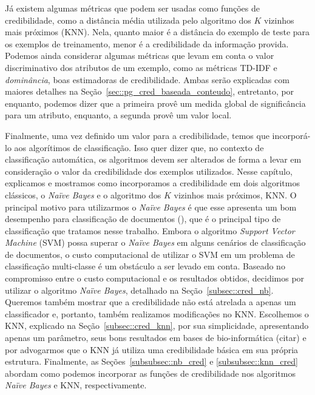 
Já existem algumas métricas que podem ser usadas como funções de credibilidade, como a distância média utilizada pelo algoritmo dos $K$ vizinhos mais próximos (\textsc{KNN}). Nela, quanto maior é a distância do exemplo de teste para os exemplos de treinamento, menor é a credibilidade da informação provida. Podemos ainda considerar algumas métricas que levam em conta o valor discriminativo dos atributos de um exemplo, como as métricas \textsc{TD-IDF} e \textit{dominância}, boas estimadoras de credibilidade. Ambas serão explicadas com maiores detalhes na Seção~\ref{sec::pg_cred_baseada_conteudo}, entretanto, por enquanto, podemos dizer que a primeira provê um medida global de significância para um atributo, enquanto, a segunda provê um valor local. 

Finalmente, uma vez definido um valor para a credibilidade, temos que incorporá-lo aos algorítimos de classificação. Isso quer dizer que, no contexto de classificação automática, os algoritmos devem ser alterados de forma a levar em consideração o valor da credibilidade dos exemplos utilizados. Nesse capítulo, explicamos e mostramos como incorporamos a credibilidade em dois algoritmos clássicos, o \textit{Naïve Bayes} e o algoritmo dos $K$ vizinhos mais próximos, \textsc{KNN}. O principal motivo para utilizarmos o \textit{Naïve Bayes} é que esse apresenta um bom desempenho  para classificação de documentos (\cite{Salles10}), que é o principal tipo de classificação que tratamos nesse trabalho. Embora o algoritmo \textit{Support Vector Machine} (\textsc{SVM}) possa superar o \textit{Naïve Bayes} em alguns cenários de classificação de documentos, o custo computacional de utilizar o \textsc{SVM} em um problema de classificação multi-classe é um obstáculo a ser levado em conta. Baseado no compromisso entre o custo computacional e os resultados obtidos, decidimos por utilizar o algoritmo \textit{Naïve Bayes}, detalhado na Seção~\ref{subsec::cred_nb}. Queremos também mostrar que a credibilidade não está atrelada a apenas um classificador e, portanto, também realizamos modificações no \textsc{KNN}. Escolhemos o \textsc{KNN}, explicado na Seção~\ref{subsec::cred_knn}, por sua simplicidade, apresentando apenas um parâmetro, seus bons resultados em bases de bio-informática (citar) e por advogarmos que o \textsc{KNN} já utiliza uma credibilidade básica em sua própria estrutura. Finalmente, as Seções~\ref{subsubsec::nb_cred} e \ref{subsubsec::knn_cred} abordam como podemos incorporar as funções de credibilidade nos algoritmos \textit{Naïve Bayes} e \textsc{KNN}, respectivamente.

